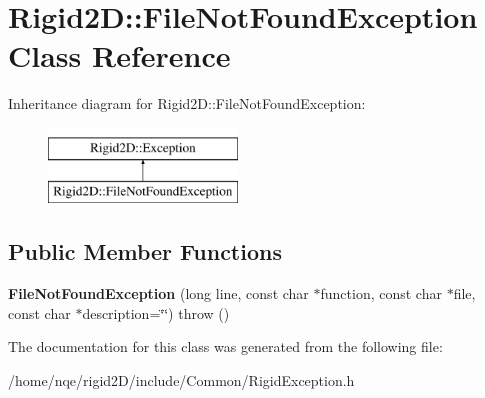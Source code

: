 \hypertarget{class_rigid2_d_1_1_file_not_found_exception}{
\section{Rigid2D::FileNotFoundException Class Reference}
\label{class_rigid2_d_1_1_file_not_found_exception}
}
Inheritance diagram for Rigid2D::FileNotFoundException:\begin{figure}[H]
\begin{center}
\leavevmode
\includegraphics[height=2cm]{class_rigid2_d_1_1_file_not_found_exception}
\end{center}
\end{figure}
\subsection*{Public Member Functions}
\begin{DoxyCompactItemize}
\item 
\hypertarget{class_rigid2_d_1_1_file_not_found_exception_a632e7b3967027bc3c985e7331c6f3a34}{
{\bfseries FileNotFoundException} (long line, const char $\ast$function, const char $\ast$file, const char $\ast$description=\char`\"{}\char`\"{})  throw ()}
\label{class_rigid2_d_1_1_file_not_found_exception_a632e7b3967027bc3c985e7331c6f3a34}

\end{DoxyCompactItemize}


The documentation for this class was generated from the following file:\begin{DoxyCompactItemize}
\item 
/home/nqe/rigid2D/include/Common/RigidException.h\end{DoxyCompactItemize}
